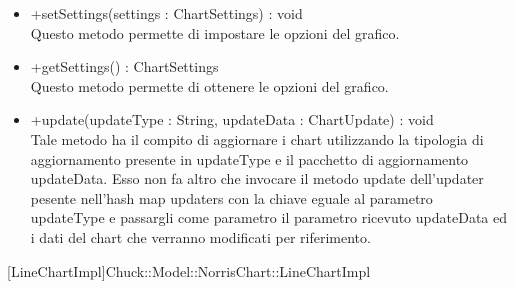 \begin{itemize}
\begin{itemize}
					\item[\ding{111}] {{+setSettings(settings : ChartSettings) : void}} \\ [1mm] Questo metodo permette di impostare le opzioni del grafico.
					\item[\ding{111}] {{+getSettings() : ChartSettings}} \\ [1mm] Questo metodo permette di ottenere le opzioni del grafico.
					\item[\ding{111}] {{+update(updateType : String, updateData : ChartUpdate) : void}} \\ [1mm] Tale metodo ha il compito di aggiornare i chart utilizzando la tipologia di aggiornamento presente in updateType e il pacchetto di aggiornamento updateData. Esso non fa altro che invocare il metodo update dell’updater pesente nell’hash map updaters con la chiave eguale al parametro updateType e passargli come parametro il parametro ricevuto updateData ed i dati del chart che verranno modificati per riferimento.
				\end{itemize}
		
			\end{itemize}

			
			[LineChartImpl]{Chuck::Model::NorrisChart::LineChartImpl}
			

	
